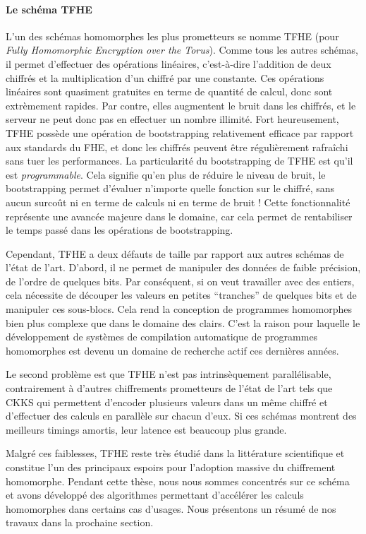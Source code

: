 \paragraph{Le schéma TFHE}
L'un des schémas homomorphes les plus prometteurs se nomme TFHE \cite{JC:CGGI20} (pour \textit{Fully Homomorphic Encryption over the Torus}). Comme tous les autres schémas, il permet d'effectuer des opérations linéaires, c'est-à-dire l'addition de deux chiffrés et la multiplication d'un chiffré par une constante. Ces opérations linéaires sont quasiment gratuites en terme de quantité de calcul, donc sont extrèmement rapides. Par contre, elles augmentent le bruit dans les chiffrés, et le serveur ne peut donc pas en effectuer un nombre illimité. Fort heureusement, TFHE possède une opération de bootstrapping relativement efficace par rapport aux standards du FHE, et donc les chiffrés peuvent être régulièrement rafraîchi sans tuer les performances. 
La particularité du bootstrapping de TFHE est qu'il est \textit{programmable}. Cela signifie qu'en plus de réduire le niveau de bruit, le bootstrapping permet d'évaluer n'importe quelle fonction sur le chiffré, sans aucun surcoût ni en terme de calculs ni en terme de bruit ! Cette fonctionnalité représente une avancée majeure dans le domaine, car cela permet de rentabiliser le temps passé dans les opérations de bootstrapping.

Cependant, TFHE a deux défauts de taille par rapport aux autres schémas de l'état de l'art. D'abord, il ne permet de manipuler des données de faible précision, de l'ordre de quelques bits. Par conséquent, si on veut travailler avec des entiers, cela nécessite de découper les valeurs en petites ``tranches'' de quelques bits et de manipuler ces sous-blocs. Cela rend la conception de programmes homomorphes bien plus complexe que dans le domaine des clairs. C'est la raison pour laquelle le développement de systèmes de compilation automatique de programmes homomorphes est devenu un domaine de recherche actif ces dernières années.

Le second problème est que TFHE n'est pas intrinsèquement parallélisable, contrairement à d'autres chiffrements prometteurs de l'état de l'art tels que CKKS \cite{AC:CKKS17} qui permettent d'encoder plusieurs valeurs dans un même chiffré et d'effectuer des calculs en parallèle sur chacun d'eux. Si ces schémas montrent des meilleurs timings amortis, leur latence est beaucoup plus grande.


Malgré ces faiblesses, TFHE reste très étudié dans la littérature scientifique et constitue l'un des principaux espoirs pour l'adoption massive du chiffrement homomorphe. Pendant cette thèse, nous nous sommes concentrés sur ce schéma et avons développé des algorithmes permettant d'accélérer les calculs homomorphes dans certains cas d'usages. Nous présentons un résumé de nos travaux dans la prochaine section.




